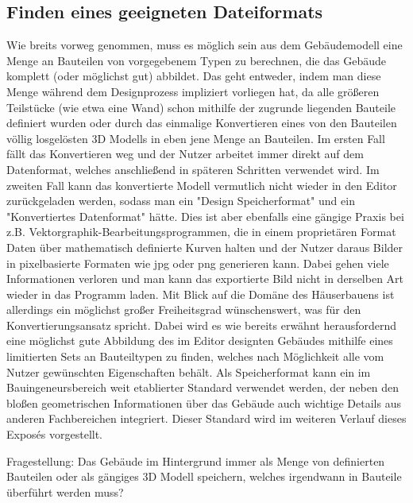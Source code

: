 \subsection{Finden eines geeigneten Dateiformats}
Wie breits vorweg genommen, muss es möglich sein aus dem Gebäudemodell eine Menge an Bauteilen von vorgegebenem Typen zu berechnen, die das Gebäude komplett (oder möglichst gut) abbildet.
Das geht entweder, indem man diese Menge während dem Designprozess impliziert vorliegen hat, da alle größeren Teilstücke (wie etwa eine Wand) schon mithilfe der zugrunde liegenden Bauteile definiert wurden oder durch das einmalige Konvertieren eines von den Bauteilen völlig losgelösten 3D Modells in eben jene Menge an Bauteilen.
Im ersten Fall fällt das Konvertieren weg und der Nutzer arbeitet immer direkt auf dem Datenformat, welches anschließend in späteren Schritten verwendet wird.
Im zweiten Fall kann das konvertierte Modell vermutlich nicht wieder in den Editor zurückgeladen werden, sodass man ein "Design Speicherformat" und ein "Konvertiertes Datenformat" hätte.
Dies ist aber ebenfalls eine gängige Praxis bei z.B. Vektorgraphik-Bearbeitungsprogrammen, die in einem proprietären Format Daten über mathematisch definierte Kurven halten und der Nutzer daraus Bilder in pixelbasierte Formaten wie jpg oder png generieren kann.
Dabei gehen viele Informationen verloren und man kann das exportierte Bild nicht in derselben Art wieder in das Programm laden.
Mit Blick auf die Domäne des Häuserbauens ist allerdings ein möglichst großer Freiheitsgrad wünschenswert, was für den Konvertierungsansatz spricht.
Dabei wird es wie bereits erwähnt herausfordernd eine möglichst gute Abbildung des im Editor designten Gebäudes mithilfe eines limitierten Sets an Bauteiltypen zu finden, welches nach Möglichkeit alle vom Nutzer gewünschten Eigenschaften behält.
Als Speicherformat kann ein im Bauingeneursbereich weit etablierter Standard verwendet werden, der neben den bloßen geometrischen Informationen über das Gebäude auch wichtige Details aus anderen Fachbereichen integriert.
Dieser Standard wird im weiteren Verlauf dieses Expos\'{e}s vorgestellt.

Fragestellung: Das Gebäude im Hintergrund immer als Menge von definierten Bauteilen oder als gängiges 3D Modell speichern, welches irgendwann in Bauteile überführt werden muss?

